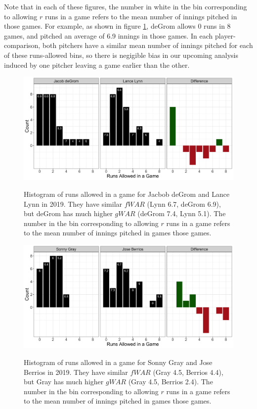 \documentclass[12pt]{article}
\begin{document}
Note that in each of these figures, the number in white in the bin corresponding to allowing $r$ runs in a game refers to the mean number of innings pitched in those games. For example, as shown in figure \ref{fig:p2}, deGrom allows 0 runs in 8 games, and pitched an average of 6.9 innings in those games. In each player-comparison, both pitchers have a similar mean number of innings pitched for each of these runs-allowed bins, so there is negigible bias in our upcoming analysis induced by one pitcher leaving a game earlier than the other. 

\begin{figure}[t!]
\centering
\caption{Histogram of runs allowed in a game for Jacbob deGrom and Lance Lynn in 2019. They have similar $fWAR$ (Lynn 6.7, deGrom 6.9), but deGrom has much higher $gWAR$ (deGrom 7.4, Lynn 5.1). The number in the bin corresponding to allowing $r$ runs in a game refers to the mean number of innings pitched in games those games.} 
\includegraphics[width=15cm]{../writeup_plots/p2_2019.png}
\label{fig:p2}
\end{figure}

\begin{figure}[t!]
\centering
\caption{Histogram of runs allowed in a game for Sonny Gray and Jose Berrios in 2019. They have similar $fWAR$ (Gray 4.5, Berrios 4.4), but Gray has much higher $gWAR$ (Gray 4.5, Berrios 2.4). The number in the bin corresponding to allowing $r$ runs in a game refers to the mean number of innings pitched in games those games.} 
\includegraphics[width=15cm]{../writeup_plots/p3_2019.png}
\label{fig:p3}
\end{figure}
\end{document}
